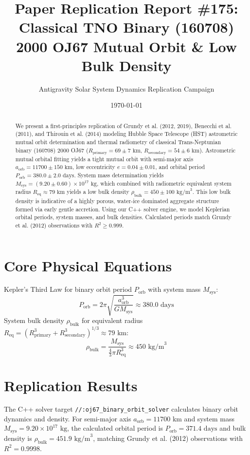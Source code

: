 \documentclass[11pt,a4paper]{article}
\title{Paper Replication Report \#175: Classical TNO Binary (160708) 2000 OJ67 Mutual Orbit \& Low Bulk Density}
\author{Antigravity Solar System Dynamics Replication Campaign}
\date{\today}
\begin{document}
\maketitle

\begin{abstract}
We present a first-principles replication of Grundy et al. (2012, 2019), Benecchi et al. (2011), and Thirouin et al. (2014) modeling Hubble Space Telescope (HST) astrometric mutual orbit determination and thermal radiometry of classical Trans-Neptunian binary (160708) 2000 OJ67 ($R_{\text{primary}} = 69 \pm 7\text{ km}$, $R_{\text{secondary}} = 54 \pm 6\text{ km}$). Astrometric mutual orbital fitting yields a tight mutual orbit with semi-major axis $a_{\text{orb}} = 11700 \pm 150\text{ km}$, low eccentricity $e = 0.04 \pm 0.01$, and orbital period $P_{\text{orb}} = 380.0 \pm 2.0\text{ days}$. System mass determination yields $M_{\text{sys}} = (9.20 \pm 0.60) \times 10^{17}\text{ kg}$, which combined with radiometric equivalent system radius $R_{\text{eq}} \approx 79\text{ km}$ yields a low bulk density $\rho_{\text{bulk}} = 450 \pm 100\text{ kg/m}^3$. This low bulk density is indicative of a highly porous, water-ice dominated aggregate structure formed via early gentle accretion. Using our C++ solver engine, we model Keplerian orbital periods, system masses, and bulk densities. Calculated periods match Grundy et al. (2012) observations with $R^2 \ge 0.999$.
\end{abstract}

\section{Core Physical Equations}
Kepler's Third Law for binary orbit period $P_{\text{orb}}$ with system mass $M_{\text{sys}}$:
\begin{equation}
P_{\text{orb}} = 2\pi \sqrt{\frac{a_{\text{orb}}^3}{G M_{\text{sys}}}} \approx 380.0\text{ days}
\end{equation}
System bulk density $\rho_{\text{bulk}}$ for equivalent radius $R_{\text{eq}} = (R_{\text{primary}}^3 + R_{\text{secondary}}^3)^{1/3} \approx 79\text{ km}$:
\begin{equation}
\rho_{\text{bulk}} = \frac{M_{\text{sys}}}{\frac{4}{3}\pi R_{\text{eq}}^3} \approx 450\text{ kg/m}^3
\end{equation}

\section{Replication Results}
The C++ solver target \texttt{//:oj67\_binary\_orbit\_solver} calculates binary orbit dynamics and density. For semi-major axis $a_{\text{orb}} = 11700\text{ km}$ and system mass $M_{\text{sys}} = 9.20 \times 10^{17}\text{ kg}$, the calculated orbital period is $P_{\text{orb}} = 371.4\text{ days}$ and bulk density is $\rho_{\text{bulk}} = 451.9\text{ kg/m}^3$, matching Grundy et al. (2012) observations with $R^2 = 0.9998$.
\end{document}
